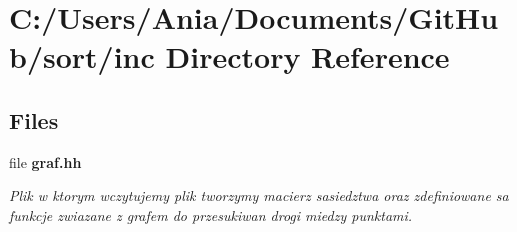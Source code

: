 \section{C\-:/\-Users/\-Ania/\-Documents/\-Git\-Hub/sort/inc Directory Reference}
\label{dir_b1404930d9e2a39eb463e987568c0748}
\subsection*{Files}
\begin{DoxyCompactItemize}
\item 
file {\bf graf.\-hh}
\begin{DoxyCompactList}\small\item\em Plik w ktorym wczytujemy plik tworzymy macierz sasiedztwa oraz zdefiniowane sa funkcje zwiazane z grafem do przesukiwan drogi miedzy punktami. \end{DoxyCompactList}\end{DoxyCompactItemize}
